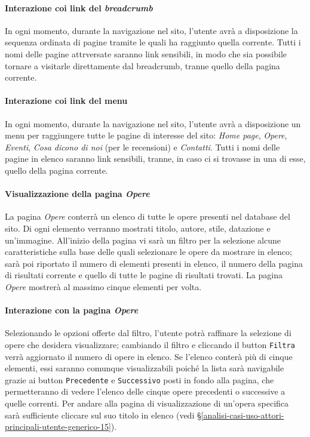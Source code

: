 \paragraph{Interazione coi link del \textit{breadcrumb}}
\label{analisi-casi-uso-attori-principali-utente-generico-2}
In ogni momento, durante la navigazione nel sito, l'utente avrà a disposizione la sequenza ordinata di pagine tramite le quali ha raggiunto quella corrente. Tutti i nomi delle pagine attrversate saranno link sensibili, in modo che sia possibile tornare a visitarle direttamente dal breadcrumb, tranne quello della pagina corrente.


\paragraph{Interazione coi link del menu}
\label{analisi-casi-uso-attori-principali-utente-generico-3}
In ogni momento, durante la navigazione nel sito, l'utente avrà a disposizione un menu per raggiungere tutte le pagine di interesse del sito: \textit{Home page}, \textit{Opere}, \textit{Eventi}, \textit{Cosa dicono di noi} (per le recensioni) e \textit{Contatti}. Tutti i nomi delle pagine in elenco saranno link sensibili, tranne, in caso ci si trovasse in una di esse, quello della pagina corrente.


\paragraph{Visualizzazione della pagina \textit{Opere}}
\label{analisi-casi-uso-attori-principali-utente-generico-4}
La pagina \textit{Opere} conterrà un elenco di tutte le opere presenti nel database del sito. Di ogni elemento verranno mostrati titolo, autore, stile, datazione e un'immagine. All'inizio della pagina vi sarà un filtro per la selezione alcune caratteristiche sulla base delle quali selezionare le opere da mostrare in elenco; sarà poi riportato il numero di elementi presenti in elenco, il numero della pagina di risultati corrente e quello di tutte le pagine di risultati trovati. La pagina \textit{Opere} mostrerà al massimo cinque elementi per volta.


\paragraph{Interazione con la pagina \textit{Opere}}
\label{analisi-casi-uso-attori-principali-utente-generico-5}
Selezionando le opzioni offerte dal filtro, l'utente potrà raffinare la selezione di opere che desidera visualizzare; cambiando il filtro e cliccando il button \texttt{Filtra} verrà aggiornato il numero di opere in elenco. Se l'elenco conterà più di cinque elementi, essi saranno comunque visualizzabili poiché la lista sarà navigabile grazie ai button \texttt{Precedente} e \texttt{Successivo} posti in fondo alla pagina, che permetteranno di vedere l'elenco delle cinque opere precedenti o successive a quelle correnti. Per andare alla pagina di visualizzazione di un'opera specifica sarà sufficiente cliccare sul suo titolo in elenco (vedi §\ref{analisi-casi-uso-attori-principali-utente-generico-15}).


